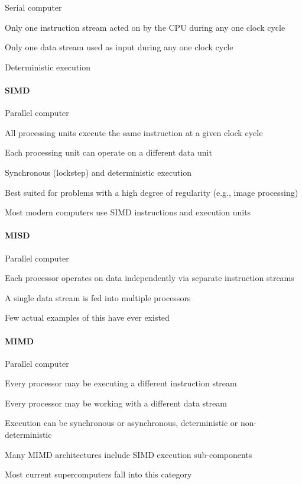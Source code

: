 \documentclass[12pt]{article}
\begin{document}
\begin{compactitem}
\item Serial computer
\item Only one instruction stream acted on by the CPU during any one clock
      cycle
\item Only one data stream used as input during any one clock cycle
\item Deterministic execution
\end{compactitem}

\paragraph*{SIMD}

\begin{compactitem}
\item Parallel computer
\item All processing units execute the same instruction at a given clock cycle
\item Each processing unit can operate on a different data unit
\item Synchronous (lockstep) and deterministic execution
\item Best suited for problems with a high degree of regularity (e.g., image
      processing)
\item Most modern computers use SIMD instructions and execution units
\end{compactitem}

\paragraph*{MISD}

\begin{compactitem}
\item Parallel computer
\item Each processor operates on data independently via separate instruction
      streams
\item A single data stream is fed into multiple processors
\item Few actual examples of this have ever existed
\end{compactitem}

\paragraph*{MIMD}

\begin{compactitem}
\item Parallel computer
\item Every processor may be executing a different instruction stream
\item Every processor may be working with a different data stream
\item Execution can be synchronous or asynchronous, deterministic or
      non-deterministic
\item Many MIMD architectures include SIMD execution sub-components
\item Most current supercomputers fall into this category
\end{compactitem}
\end{document}
